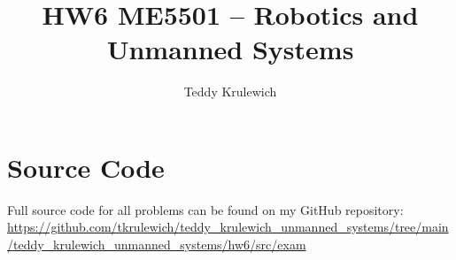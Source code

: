 \documentclass{article}
\author{Teddy Krulewich}
\title{\vspace{-4em}HW6 ME5501 – Robotics and Unmanned Systems}
\begin{document}
\maketitle

\section*{Source Code}

Full source code for all problems can be found on my GitHub repository:
\url{https://github.com/tkrulewich/teddy_krulewich_unmanned_systems/tree/main/teddy_krulewich_unmanned_systems/hw6/src/exam}
\end{document}
